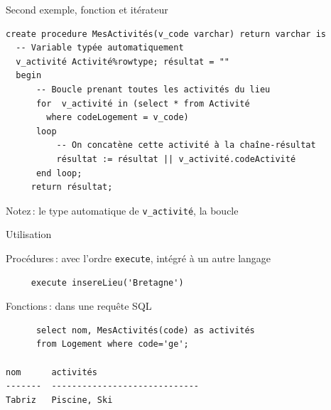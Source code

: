 \begin{frame}[fragile]{Second exemple, fonction et itérateur}

\begin{footnotesize}
\begin{verbatim}
create procedure MesActivités(v_code varchar) return varchar is
  -- Variable typée automatiquement
  v_activité Activité%rowtype; résultat = ""
  begin
      -- Boucle prenant toutes les activités du lieu
      for  v_activité in (select * from Activité
        where codeLogement = v_code)
      loop
          -- On concatène cette activité à la chaîne-résultat
          résultat := résultat || v_activité.codeActivité
      end loop;
     return résultat;
\end{verbatim}
\end{footnotesize}

\vfill
Notez\,: le type automatique de \texttt{v\_activité}, la boucle

\end{frame}

\begin{frame}[fragile]{Utilisation}

\begin{redbullet}

 \item Procédures\,: avec l'ordre \texttt{execute}, intégré à  un autre langage
 
   \begin{verbatim}
     execute insereLieu('Bretagne')
  \end{verbatim}
 
 \item Fonctions\,: dans une requête SQL
   \begin{verbatim}
      select nom, MesActivités(code) as activités 
      from Logement where code='ge';

nom      activités
-------  -----------------------------
Tabriz   Piscine, Ski
\end{verbatim}
 
\end{redbullet}

\end{frame}


